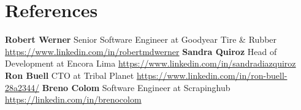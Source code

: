 \documentclass[11pt,a4paper,english]{moderncv}
\begin{document}
\subsection{}

\section{References}
\cvlistitem
{
    \textbf{Robert Werner}
    \newline{}
    Senior Software Engineer at Goodyear Tire \& Rubber
    \newline{}
    \url{https://www.linkedin.com/in/robertmdwerner}
}
\cvlistitem
{
    \textbf{Sandra Quiroz}
    \newline{}
    Head of Development at Encora Lima
    \newline{}
    \url{https://www.linkedin.com/in/sandradiazquiroz}
}
\cvlistitem
{
    \textbf{Ron Buell}
    \newline{}
    CTO at Tribal Planet
    \newline{}
    \url{https://www.linkedin.com/in/ron-buell-28a2344/}
}
\cvlistitem
{
    \textbf{Breno Colom}
    \newline{}
    Software Engineer at Scrapinghub
    \newline{}
    \url{https://linkedin.com/in/brenocolom}
}
\end{document}
